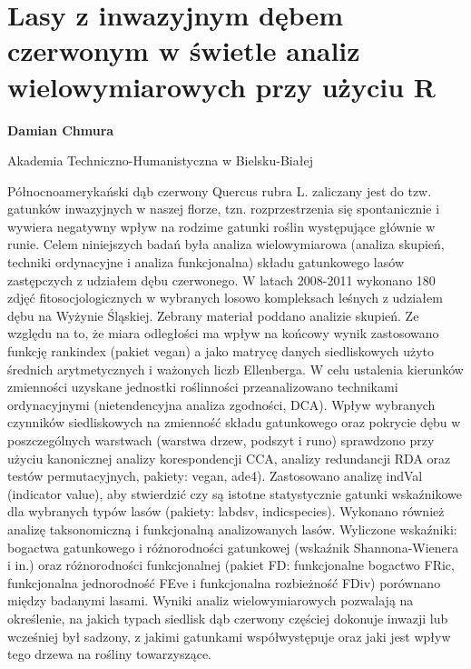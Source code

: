 \documentclass[\main/boa.tex]{subfiles}
\begin{document}
\section{Lasy z inwazyjnym dębem czerwonym w świetle analiz wielowymiarowych przy użyciu R }

\begin{minipage}{0.915\textwidth}
	\centering
  {\bf {} Damian Chmura }
\end{minipage}

\vskip 0.3cm

\begin{affiliations}
\begin{minipage}{0.915\textwidth}
\centering
Akademia Techniczno-Humanistyczna w Bielsku-Białej  \\[-2pt]
\end{minipage}
\end{affiliations}

\vskip 0.8cm

 Północnoamerykański dąb czerwony Quercus rubra L. zaliczany jest do tzw. gatunków inwazyjnych w naszej florze, tzn. rozprzestrzenia się spontanicznie i wywiera negatywny wpływ na rodzime gatunki roślin występujące głównie w runie. Celem niniejszych badań była analiza wielowymiarowa (analiza skupień, techniki ordynacyjne i analiza funkcjonalna) składu gatunkowego lasów zastępczych z udziałem dębu czerwonego. W latach 2008-2011 wykonano 180 zdjęć fitosocjologicznych w wybranych losowo kompleksach leśnych z udziałem dębu na Wyżynie Śląskiej. Zebrany materiał poddano analizie skupień. Ze względu na to, że miara odległości ma wpływ na końcowy wynik zastosowano funkcję rankindex (pakiet vegan) a jako matrycę danych siedliskowych użyto średnich arytmetycznych i ważonych liczb Ellenberga. W celu ustalenia kierunków zmienności uzyskane jednostki roślinności przeanalizowano technikami ordynacyjnymi (nietendencyjna analiza zgodności, DCA). Wpływ wybranych czynników siedliskowych na zmienność składu gatunkowego oraz pokrycie dębu w poszczególnych warstwach (warstwa drzew, podszyt i runo) sprawdzono przy użyciu kanonicznej analizy korespondencji CCA, analizy redundancji RDA oraz testów permutacyjnych, pakiety: vegan, ade4). Zastosowano analizę indVal (indicator value), aby stwierdzić czy są istotne statystycznie gatunki wskaźnikowe dla wybranych typów lasów (pakiety: labdsv, indicspecies). Wykonano również analizę taksonomiczną i funkcjonalną analizowanych lasów. Wyliczone wskaźniki: bogactwa gatunkowego i różnorodności gatunkowej (wskaźnik Shannona-Wienera i in.) oraz różnorodności funkcjonalnej (pakiet FD: funkcjonalne bogactwo FRic, funkcjonalna jednorodność FEve i funkcjonalna rozbieżność FDiv) porównano między badanymi lasami. Wyniki analiz wielowymiarowych pozwalają na określenie, na jakich typach siedlisk dąb czerwony częściej dokonuje inwazji lub wcześniej był sadzony, z jakimi gatunkami współwystępuje oraz jaki jest wpływ tego drzewa na rośliny towarzyszące. 
\end{document}
